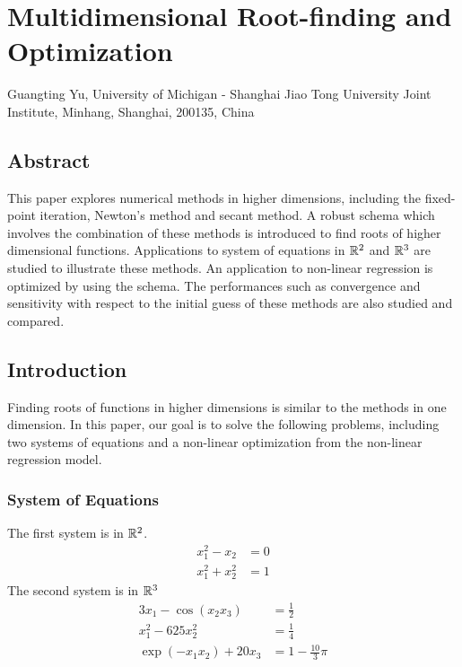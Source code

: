 \chapter{Multidimensional Root-finding and Optimization}
\begin{center}
Guangting Yu, University of Michigan - Shanghai Jiao Tong University Joint Institute, Minhang, Shanghai, 200135, China
\end{center}


\section*{Abstract}
This paper explores numerical methods in higher dimensions, including the fixed-point iteration, Newton's method and secant method.
A robust schema which involves the combination of these methods is introduced to find roots of higher dimensional functions.
Applications to system of equations in \(\mathbb{R}^2\) and \(\mathbb{R}^3\) are studied to illustrate these methods.
An application to non-linear regression is optimized by using the schema.
The performances such as convergence and sensitivity with respect to the initial guess of these methods are also studied and compared.



\section{Introduction}
Finding roots of functions in higher dimensions is similar to the methods in one dimension.
In this paper, our goal is to solve the following problems, including two systems of equations and a non-linear optimization from the non-linear regression model.


\subsection{System of Equations}
The first system is in \(\mathbb{R}^2\).
\begin{equation}\label{eqn1}
\begin{aligned}
x_1^2-x_2&=0\\
x_1^2+x_2^2&=1
\end{aligned}
\end{equation}
The second system is in \(\mathbb{R}^3\)
\begin{equation}\label{eqn2}
\begin{aligned}
3x_1-\cos(x_2x_3)&=\frac{1}{2}\\
x_1^2-625x_2^2&=\frac{1}{4}\\
\exp(-x_1x_2)+20x_3&=1-\frac{10}{3}\pi
\end{aligned}
\end{equation}



